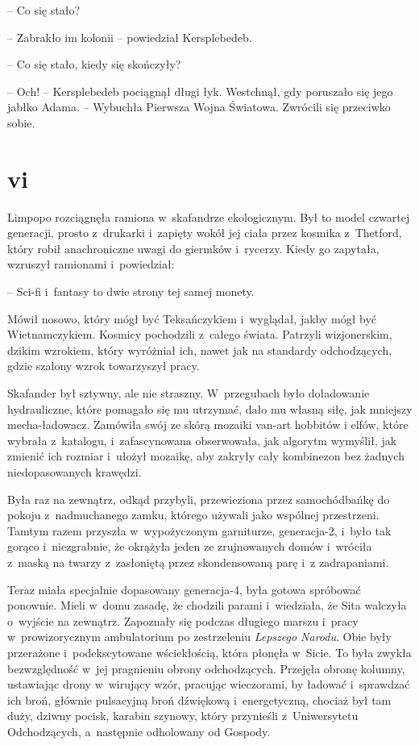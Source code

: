 \documentclass[oneside,polish,11pt,sfheadings]{mwbk}
\begin{document}
-- Co się stało?

-- Zabrakło im kolonii -- powiedział Kersplebedeb.

-- Co się stało, kiedy się skończyły?

-- Och! -- Kersplebedeb pociągnął długi łyk. Westchnął, gdy poruszało się
jego jabłko Adama. -- Wybuchła Pierwsza Wojna Światowa. Zwrócili się
przeciwko sobie.

\chapter*{vi}

Limpopo rozciągnęła ramiona w~skafandrze ekologicznym. Był to model
czwartej generacji, prosto z~drukarki i~zapięty wokół jej ciała przez
kosmika z~Thetford, który robił anachroniczne uwagi do giermków i~rycerzy. Kiedy go zapytała, wzruszył ramionami i~powiedział: 

-- Sci-fi i~fantasy to dwie strony tej samej monety. 

Mówił nosowo, który mógł być
Teksańczykiem i~wyglądał, jakby mógł być Wietnamczykiem. Kosmicy
pochodzili z~całego świata. Patrzyli wizjonerskim, dzikim wzrokiem,
który wyróżniał ich, nawet jak na standardy odchodzących, gdzie szalony
wzrok towarzyszył pracy.

Skafander był sztywny, ale nie straszny. W~przegubach było doładowanie
hydrauliczne, które pomagało się mu utrzymać, dało mu własną siłę, jak
mniejszy mecha-ładowacz. Zamówiła swój ze skórą mozaiki van-art hobbitów
i elfów, które wybrała z~katalogu, i~zafascynowana obserwowała, jak
algorytm wymyślił, jak zmienić ich rozmiar i~ułożył mozaikę, aby zakryły
cały kombinezon bez żadnych niedopasowanych krawędzi.

Była raz na zewnątrz, odkąd przybyli, przewieziona przez samochód\dywiz bańkę
do pokoju z~nadmuchanego zamku, którego używali jako wspólnej
przestrzeni. Tamtym razem przyszła w~wypożyczonym garniturze,
generacja-2, i~było tak gorąco i~niezgrabnie, że okrążyła jeden ze
zrujnowanych domów i~wróciła z~maską na twarzy z~zasłoniętą przez
skondensowaną parę i~z zadrapaniami.

Teraz miała specjalnie dopasowany generacja-4, była gotowa spróbować
ponownie. Mieli w~domu zasadę, że chodzili parami i~wiedziała, że Sita
walczyła o~wyjście na zewnątrz. Zapoznały się podczas długiego marszu i~pracy w~prowizorycznym ambulatorium po zestrzeleniu \textit{Lepszego
Narodu}. Obie były przerażone i~podekscytowane wściekłością, która
płonęła w~Sicie. To była zwykła bezwzględność w~jej pragnieniu obrony
odchodzących. Przejęła obronę kolumny, ustawiając drony w~wirujący wzór,
pracując wieczorami, by ładować i~sprawdzać ich broń, głównie pulsacyjną
broń dźwiękową i~energetyczną, chociaż był tam duży, dziwny pocisk,
karabin szynowy, który przynieśli z~Uniwersytetu Odchodzących, a~następnie odholowany od Gospody.
\end{document}
